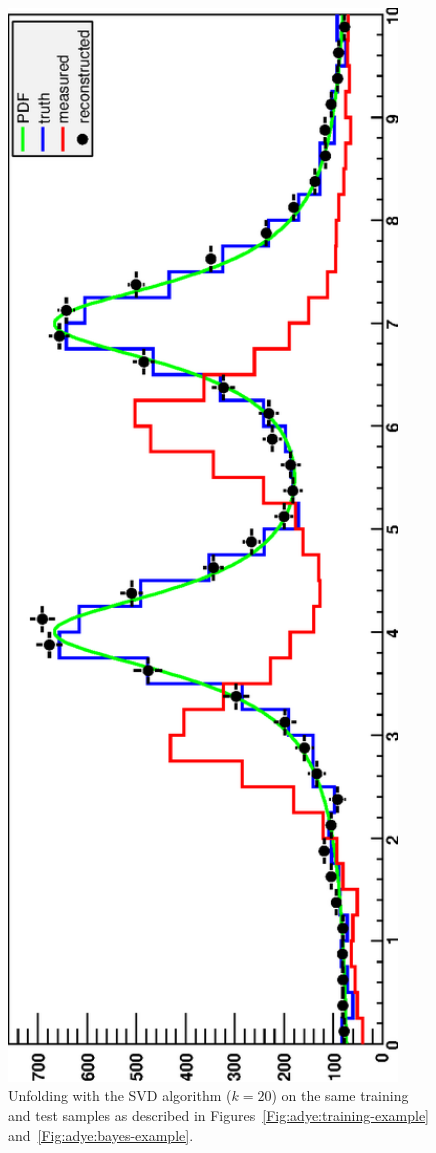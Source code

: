 \documentclass{desyproc}
\begin{document}
\begin{figure}[ht]
\centerline{\includegraphics[angle=-90,width=0.92\textwidth,clip]{adye_tim.svd2.eps}}
\caption{Unfolding with the SVD algorithm ($k=20$) on
the same training and test samples as described in Figures~\ref{Fig:adye:training-example}
and~\ref{Fig:adye:bayes-example}.}\label{Fig:adye:svd-example}
\end{figure}
\end{document}

